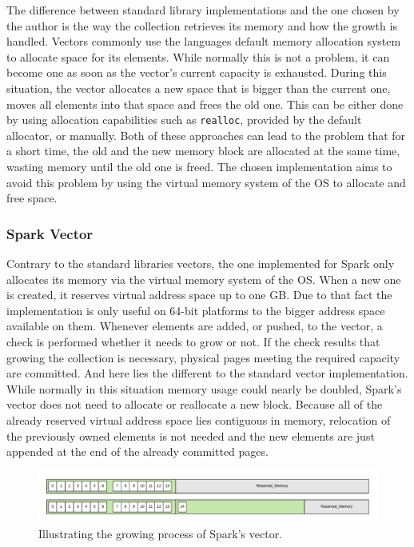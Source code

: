 The difference between standard library implementations and the one chosen by the author is the way the collection retrieves its memory and how the growth is handled. Vectors commonly use the languages default memory allocation system to allocate space for its elements. While normally this is not a problem, it can become one as soon as the vector's current capacity is exhausted. During this situation, the vector allocates a new space that is bigger than the current one, moves all elements into that space and frees the old one. This can be either done by using allocation capabilities such as \texttt{realloc}, provided by the default allocator, or manually. Both of these approaches can lead to the problem that for a short time, the old and the new memory block are allocated at the same time, wasting memory until the old one is freed. The chosen implementation aims to avoid this problem by using the virtual memory system of the \ac{OS} to allocate and free space.

\subsubsection{Spark Vector}

Contrary to the standard libraries vectors, the one implemented for Spark only allocates its memory via the virtual memory system of the \ac{OS}. When a new one is created, it reserves virtual address space up to one \ac{GB}. Due to that fact the implementation is only useful on 64-bit platforms to the bigger address space available on them. Whenever elements are added, or pushed, to the vector, a check is performed whether it needs to grow or not. If the check results that growing the collection is necessary, physical pages meeting the required capacity are committed. And here lies the different to the standard vector implementation. While normally in this situation memory usage could nearly be doubled, Spark's vector does not need to allocate or reallocate a new block. Because all of the already reserved virtual address space lies contiguous in memory, relocation of the previously owned elements is not needed and the new elements are just appended at the end of the already committed pages.\\

\begin{figure}[h!]
	\centering \includegraphics[width=\linewidth]{PICs/vector_growth.png}
	\caption{Illustrating the growing process of Spark's vector.}
	\label{fig:vector_growth}
\end{figure}

